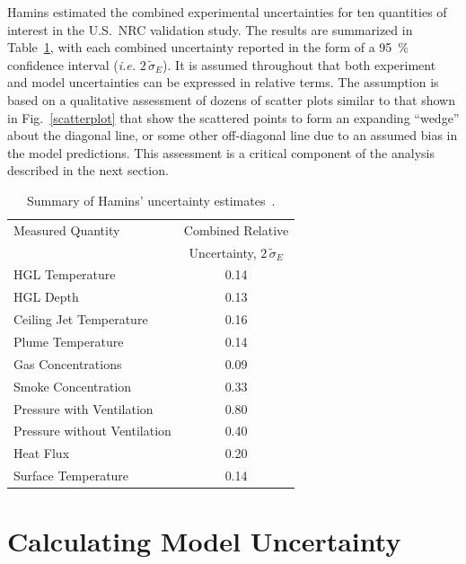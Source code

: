 Hamins estimated the combined experimental uncertainties for ten quantities of interest in the U.S.~NRC validation study.
The results are summarized in Table~\ref{Uncertainty}, with
each combined uncertainty reported in the form of a 95~\% confidence interval ({\em i.e.} $2 \, \widetilde{\sigma}_E$).
It is assumed throughout that both experiment and model uncertainties can be expressed in relative terms.
The assumption is based on a
qualitative assessment of dozens of scatter plots similar to that shown in Fig.~\ref{scatterplot} that show
the scattered points to form an expanding ``wedge''
about the diagonal line, or some other off-diagonal line due to an assumed bias in the model predictions.
This assessment is a critical component of the
analysis described in the next section.

\begin{table}[t]
\caption{Summary of Hamins' uncertainty estimates~\cite{NUREG_1824}. }
\begin{center}
\begin{tabular}{|l|c|}
\hline
Measured Quantity               & Combined Relative       \\
                                & Uncertainty, $2 \, \widetilde{\sigma}_E$       \\ \hline \hline
HGL Temperature                 & 0.14    \\ \hline
HGL Depth                       & 0.13    \\ \hline
Ceiling Jet Temperature         & 0.16    \\ \hline
Plume Temperature               & 0.14    \\ \hline
Gas Concentrations              & 0.09    \\ \hline
Smoke Concentration             & 0.33    \\ \hline
Pressure with Ventilation       & 0.80    \\ \hline
Pressure without Ventilation    & 0.40    \\ \hline
Heat Flux                       & 0.20    \\ \hline
Surface Temperature             & 0.14    \\ \hline
\end{tabular}
\end{center}
\label{Uncertainty}
\end{table}






\section{Calculating Model Uncertainty}

